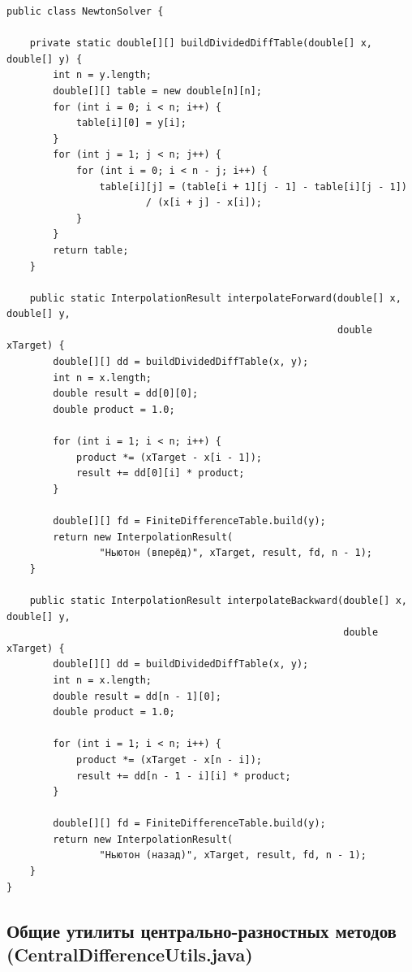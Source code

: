 \begin{lstlisting}[style=javaStyle, label=code:newton]
public class NewtonSolver {

    private static double[][] buildDividedDiffTable(double[] x, double[] y) {
        int n = y.length;
        double[][] table = new double[n][n];
        for (int i = 0; i < n; i++) {
            table[i][0] = y[i];
        }
        for (int j = 1; j < n; j++) {
            for (int i = 0; i < n - j; i++) {
                table[i][j] = (table[i + 1][j - 1] - table[i][j - 1])
                        / (x[i + j] - x[i]);
            }
        }
        return table;
    }

    public static InterpolationResult interpolateForward(double[] x, double[] y,
                                                         double xTarget) {
        double[][] dd = buildDividedDiffTable(x, y);
        int n = x.length;
        double result = dd[0][0];
        double product = 1.0;

        for (int i = 1; i < n; i++) {
            product *= (xTarget - x[i - 1]);
            result += dd[0][i] * product;
        }

        double[][] fd = FiniteDifferenceTable.build(y);
        return new InterpolationResult(
                "Ньютон (вперёд)", xTarget, result, fd, n - 1);
    }

    public static InterpolationResult interpolateBackward(double[] x, double[] y,
                                                          double xTarget) {
        double[][] dd = buildDividedDiffTable(x, y);
        int n = x.length;
        double result = dd[n - 1][0];
        double product = 1.0;

        for (int i = 1; i < n; i++) {
            product *= (xTarget - x[n - i]);
            result += dd[n - 1 - i][i] * product;
        }

        double[][] fd = FiniteDifferenceTable.build(y);
        return new InterpolationResult(
                "Ньютон (назад)", xTarget, result, fd, n - 1);
    }
}
\end{lstlisting}

\subsection{Общие утилиты центрально-разностных методов (CentralDifferenceUtils.java)}

